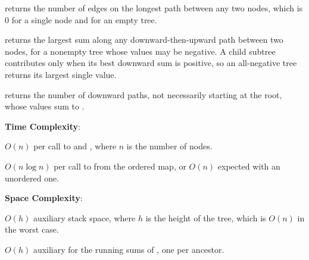 \begin{compactitem}
  \item {} returns the number of edges on the longest path between any two nodes, which is $0$ for a single node and for an empty tree.
  \item {} returns the largest sum along any downward-then-upward path between two nodes, for a nonempty tree whose values may be negative. A child subtree contributes only when its best downward sum is positive, so an all-negative tree returns its largest single value.
  \item {} returns the number of downward paths, not necessarily starting at the root, whose values sum to .
\end{compactitem}

\textbf{Time Complexity}:
\begin{compactitem}
  \item $O(n)$ per call to  and , where $n$ is the number of nodes.
  \item $O(n \log n)$ per call to  from the ordered map, or $O(n)$ expected with an unordered one.
\end{compactitem}

\textbf{Space Complexity}:
\begin{compactitem}
  \item $O(h)$ auxiliary stack space, where $h$ is the height of the tree, which is $O(n)$ in the worst case.
  \item $O(h)$ auxiliary for the running sums of , one per ancestor.
\end{compactitem}

